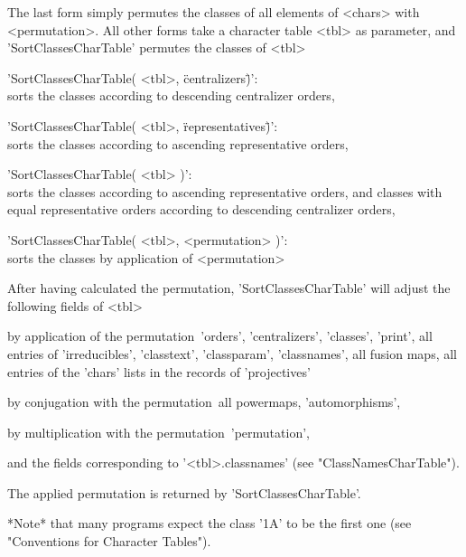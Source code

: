 The last form simply permutes the classes of all elements of <chars>
with <permutation>. All other forms take a character table <tbl> as
parameter, and 'SortClassesCharTable' permutes the classes of <tbl>\:

'SortClassesCharTable( <tbl>, \"centralizers\" )':\\
    sorts the classes according to descending centralizer orders,

'SortClassesCharTable( <tbl>, \"representatives\" )':\\
    sorts the classes according to ascending representative orders,

'SortClassesCharTable( <tbl> )':\\
    sorts the classes according to ascending representative orders,
    and classes with equal representative orders according to descending
    centralizer orders,

'SortClassesCharTable( <tbl>, <permutation> )':\\
    sorts the classes by application of <permutation>

After having calculated the permutation, 'SortClassesCharTable' will
adjust the following fields of <tbl>\:

by application of the permutation\:\ 'orders', 'centralizers', 'classes',
   'print', all entries of 'irreducibles', 'classtext', 'classparam',
   'classnames', all fusion maps, all entries of the 'chars' lists in the
   records of 'projectives'

by conjugation with the permutation\:\ all powermaps,
'automorphisms',

by multiplication with the permutation\:\ 'permutation',

and the fields corresponding to '<tbl>.classnames'
(see "ClassNamesCharTable").

The applied permutation is returned by 'SortClassesCharTable'.

*Note* that many programs expect the class '1A' to be the first one
(see "Conventions for Character Tables").

